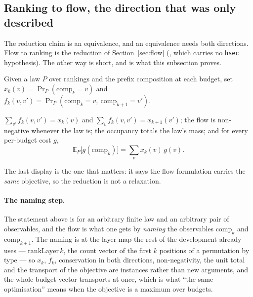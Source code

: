 \subsection{Ranking to flow, the direction that was only described}
\label{sec:ranking2flow}

The reduction claim is an equivalence, and an equivalence needs both directions. Flow to
ranking is the reduction of Section~\ref{sec:flow} (,
which carries no \texttt{hsec} hypothesis). The other way is short, and is what this subsection proves.

Given a law $P$ over rankings and the prefix composition at each budget, set
$x_{k}(v)=\Pr_{P}(\mathrm{comp}_{k}=v)$ and
$f_{k}(v,v')=\Pr_{P}(\mathrm{comp}_{k}=v,\ \mathrm{comp}_{k+1}=v')$.

\begin{theorem}
\label{thm:ranking2flow}
$\sum_{v'}f_{k}(v,v')=x_{k}(v)$ and $\sum_{v}f_{k}(v,v')=x_{k+1}(v')$; the flow is
non-negative whenever the law is; the occupancy totals the law's mass; and for every
per-budget cost $g$,
\[
\mathbb{E}_{P}\bigl[g(\mathrm{comp}_{k})\bigr]=\sum_{v}x_{k}(v)\,g(v).
\]
\end{theorem}

The last display is the one that matters: it says the flow formulation carries the
\emph{same} objective, so the reduction is not a relaxation.



\paragraph{The naming step.}
The statement above is for an arbitrary finite law and an arbitrary pair of observables, and
the flow is what one gets by \emph{naming} the observables $\mathrm{comp}_{k}$ and
$\mathrm{comp}_{k+1}$. The naming is at the layer map
the rest of the development already uses --- $\mathrm{rankLayer}\,k$, the count vector of the
first $k$ positions of a permutation by type --- so $x_{k}$, $f_{k}$, conservation in both
directions, non-negativity, the unit total and the transport of the objective are instances
rather than new arguments, and the whole budget vector transports at once, which is what
``the same optimisation'' means when the objective is a maximum over budgets.

